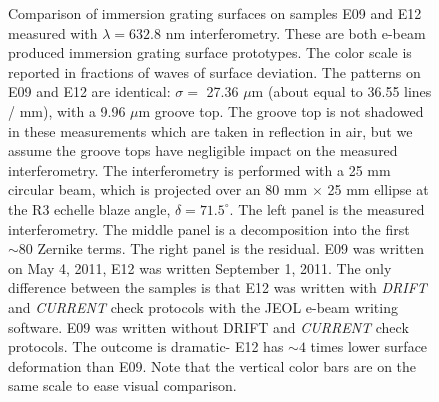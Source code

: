 \documentclass[]{spie}  %
\begin{document}
\begin{figure}
   \newline
  \caption{Comparison of immersion grating surfaces on samples E09 and E12 measured with $\lambda = 632.8 $ nm interferometry.  These are both e-beam produced immersion grating surface prototypes.  The color scale is reported in fractions of waves of surface deviation.  The patterns on E09 and E12 are identical: $\sigma = $ 27.36 $\mu$m (about equal to 36.55 lines / mm), with a 9.96 $\mu$m groove top.  The groove top is not shadowed in these measurements which are taken in reflection in air, but we assume the groove tops have negligible impact on the measured interferometry.  The interferometry is performed with a 25 mm circular beam, which is projected over an 80 mm $\times$ 25 mm ellipse at the R3 echelle blaze angle, $\delta = 71.5 ^\circ$.  The left panel is the measured interferometry.  The middle panel is a decomposition into the first $\sim 80$ Zernike terms.  The right panel is the residual.  E09 was written on May 4, 2011, E12 was written September 1, 2011.  The only difference between the samples is that E12 was written with \emph{DRIFT} and \emph{CURRENT} check protocols with the JEOL e-beam writing software.  E09 was written without {DRIFT} and \emph{CURRENT} check protocols.  The outcome is dramatic- E12 has $\sim 4$ times lower surface deformation than E09.  Note that the vertical color bars are on the same scale to ease visual comparison.}
  \label{fig:igrams}
\end{figure}
\end{document}
